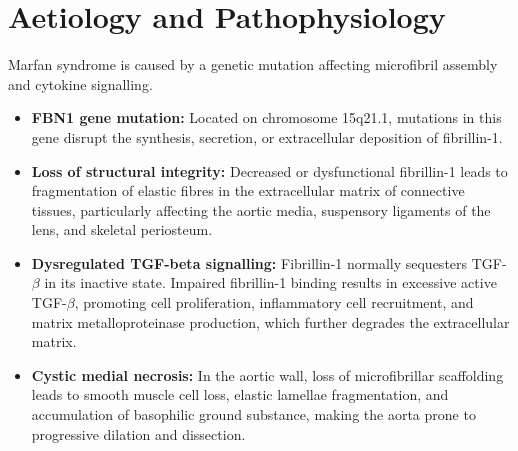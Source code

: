 \section*{Aetiology and Pathophysiology}
Marfan syndrome is caused by a genetic mutation affecting microfibril assembly and cytokine signalling.
\begin{itemize}
    \item \textbf{FBN1 gene mutation:} Located on chromosome 15q21.1, mutations in this gene disrupt the synthesis, secretion, or extracellular deposition of fibrillin-1.
    \item \textbf{Loss of structural integrity:} Decreased or dysfunctional fibrillin-1 leads to fragmentation of elastic fibres in the extracellular matrix of connective tissues, particularly affecting the aortic media, suspensory ligaments of the lens, and skeletal periosteum.
    \item \textbf{Dysregulated TGF-beta signalling:} Fibrillin-1 normally sequesters TGF-$\beta$ in its inactive state. Impaired fibrillin-1 binding results in excessive active TGF-$\beta$, promoting cell proliferation, inflammatory cell recruitment, and matrix metalloproteinase production, which further degrades the extracellular matrix.
    \item \textbf{Cystic medial necrosis:} In the aortic wall, loss of microfibrillar scaffolding leads to smooth muscle cell loss, elastic lamellae fragmentation, and accumulation of basophilic ground substance, making the aorta prone to progressive dilation and dissection.
\end{itemize}

